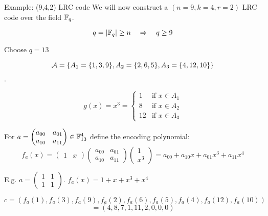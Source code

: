 \begin{frame}{Example: (9,4,2) LRC code}
        We will now construct a $(n=9, k=4, r=2)$ LRC code over the field $\mathbb{F}_q$.
        
        $$q = \vert \mathbb{F}_q \vert \geq n \quad \Rightarrow \quad q \geq 9$$
        
        Choose $q = 13$
        
        $$\mathcal{A} = \{ A_1 = \{1,3,9\}, A_2 = \{2,6,5 \}, A_3 = \{4,12,10 \} \}$$.
        
        $$g(x) = x^3 = 
        \begin{cases}
            1 & \mbox{if } x \in A_1 \\
            8 & \mbox{if } x \in A_2 \\
            12& \mbox{if } x \in A_3
        \end{cases}
        $$
    \end{frame}
    
    \begin{frame}
        For $a = 
        \begin{pmatrix}
            a_{00} & a_{01} \\
            a_{10} & a_{11}
        \end{pmatrix} \in \mathbb{F}_{13}^4$ define the encoding polynomial:
        $$f_a(x) =
        \begin{pmatrix}
            1 & x
        \end{pmatrix}
        \begin{pmatrix}
            a_{00} & a_{01} \\
            a_{10} & a_{11}
        \end{pmatrix}
        \begin{pmatrix}
            1 \\
            x^3
        \end{pmatrix} = a_{00} + a_{10}x + a_{01} x^3 + a_{11} x^4
        $$
        
        E.g. $a =         
        \begin{pmatrix}
            1 & 1 \\
            1 & 1
        \end{pmatrix}
        $. $f_a(x) = 1 + x + x^3 + x^4$
        
        $$c = (f_a(1), f_a(3), f_a(9), f_a(2), f_a(6), f_a(5), f_a(4), f_a(12), f_a(10))$$
        $$= (4,8,7,1,11,2,0,0,0)$$
    \end{frame}        
    
